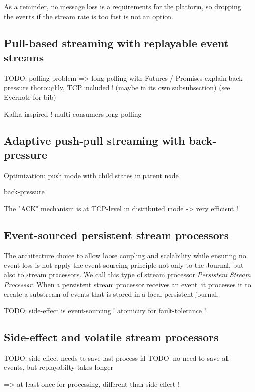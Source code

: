 As a reminder, no message loss is a requirements for the platform, so dropping the events if the stream rate is too fast is not an option.
\\

\subsection{Pull-based streaming with replayable event streams}

TODO: polling problem => long-polling with Futures / Promises
explain back-pressure thoroughly, TCP included ! (maybe in its own subsubsection) (see Evernote for bib)

Kafka inspired ! multi-consumers long-polling

\subsection{Adaptive push-pull streaming with back-pressure}

Optimization: push mode with child states in parent node

back-pressure

The "ACK" mechanism is at TCP-level in distributed mode -> very efficient !

\subsection{Event-sourced persistent stream processors}

The architecture choice to allow loose coupling and scalability while ensuring no event loss is not apply the event sourcing principle not only to the Journal, but also to 
stream processors. We call this type of stream processor \textit{Persistent Stream Processor}. When a persistent stream processor receives an event, it processes it 
to create a substream of events that is stored in a local persistent journal.

TODO: side-effect is event-sourcing ! atomicity for fault-tolerance !

\subsection{Side-effect and volatile stream processors}

TODO: side-effect needs to save last process id
TODO: no need to save all events, but replayabilty takes longer

=> at least once for processing, different than side-effect !


